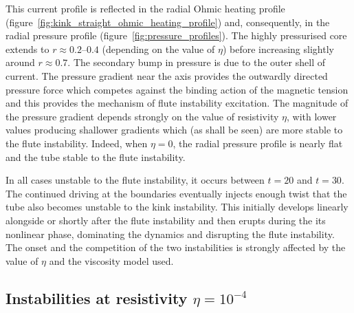 \documentclass[fleqn,usenatbib]{mnras}
\newcommand{\rs}[2]{{#2}}
\begin{document}
This current profile is reflected in the radial Ohmic heating profile
(figure~\ref{fig:kink_straight_ohmic_heating_profile}) and,
consequently, in the radial pressure profile
(figure~\ref{fig:pressure_profiles}). The highly pressurised core
extends to $r\approx 0.2$--$0.4$ (depending on the value of $\eta$)
before increasing slightly around $r\approx 0.7$. The secondary bump
in pressure is due to the outer shell of current. The pressure
gradient near the axis provides the outwardly directed pressure force
which competes against the binding action of the magnetic tension
\rs{to (potentially) result in the}{and this provides the mechanism of}
\rs{fluting}{flute} instability \rs{}{excitation}.  The magnitude
of the pressure gradient depends strongly on the value of
\rs{}{resistivity} $\eta$, with lower values producing shallower 
gradients which (as shall be seen) are more stable to the
\rs{fluting}{flute} instability. Indeed, when $\eta=0$, the radial
pressure profile is nearly flat and the tube stable to the
\rs{fluting}{flute} instability.

In all cases unstable to the \rs{fluting}{flute} instability, it
occurs \rs{some time}{} between $t=20$ and $t=30$. \rs{During this
  time, the}{The} continued driving at the boundaries eventually
injects enough twist that the tube also becomes unstable to the kink
instability. This initially develops linearly alongside \rs{}{or shortly
after} the \rs{fluting}{flute} instability and then erupts during the
\rs{kink's}{its}  nonlinear phase, dominating the dynamics and
disrupting the   \rs{fluting}{flute} instability. The \rs{}{onset and
the competition} of the two instabilities is strongly affected by
the value of $\eta$ and the viscosity model used. 

\subsection{\rs{Development where}{Instabilities at resistivity} $\eta=10^{-4}$}
\end{document}
